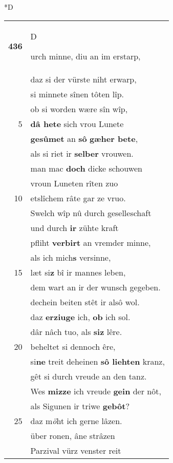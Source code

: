 \documentclass[8pt,a4paper,notitlepage]{article}
\begin{document}
\begin{table}[ht]
\begin{minipage}[t]{0.5\linewidth}
\small
\begin{center}*D
\end{center}
\begin{tabular}{rl}
\textbf{436} & \begin{large}D\end{large}urch minne, diu an im erstarp,\\ 
 & daz si der vürste niht erwarp,\\ 
 & si minnete sînen tôten lîp.\\ 
 & ob si worden wære sîn wîp,\\ 
5 & \textbf{dâ hete} sich vrou Lunete\\ 
 & \textbf{gesûmet} an \textbf{sô} \textbf{gæher bete},\\ 
 & als si riet ir \textbf{selber} vrouwen.\\ 
 & man mac \textbf{doch} dicke schouwen\\ 
 & vroun Luneten rîten zuo\\ 
10 & etslîchem râte gar ze vruo.\\ 
 & Swelch wîp nû durch geselleschaft\\ 
 & und durch \textbf{ir} zühte kraft\\ 
 & pfliht \textbf{verbirt} an vremder minne,\\ 
 & als ich mich\textbf{s} versinne,\\ 
15 & læt si\textbf{z} bî ir mannes leben,\\ 
 & dem wart an ir der wunsch gegeben.\\ 
 & dechein beiten stêt ir alsô wol.\\ 
 & daz \textbf{erziuge} ich, \textbf{ob} ich sol.\\ 
 & dâr nâch tuo, als \textbf{siz} lêre.\\ 
20 & beheltet si dennoch êre,\\ 
 & si\textbf{ne} treit deheinen \textbf{sô liehten} kranz,\\ 
 & gêt si durch vreude an den tanz.\\ 
 & Wes \textbf{mizze} ich vreude \textbf{gein} der nôt,\\ 
 & als Sigunen ir triwe \textbf{gebôt}?\\ 
25 & daz m\textit{ö}ht ich gerne lâzen.\\ 
 & über ronen, âne strâzen\\ 
 & Parzival vürz venster reit\\ 

\end{tabular}
\end{minipage}
\end{table}
\end{document}
